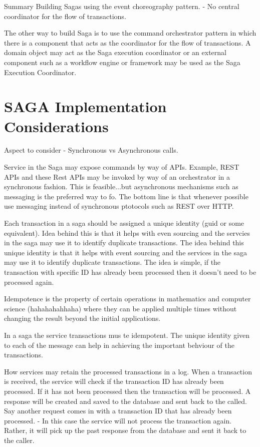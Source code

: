 \documentclass[a4paper, 11pt]{book}
\begin{document}
    Summary
    Building Sagas using the event choreography pattern.
    - No central coordinator for the flow of transactions.

    The other way to build Saga is to use the command orchestrator pattern in which there is a component that acts as the coordinator for the flow of transactions.
    A domain object may act as the Saga execution coordinator or an external component such as a workflow engine or framework may be used as the Saga Execution Coordinator.


    \section{SAGA Implementation Considerations}
    Aspect to consider - Synchronous vs Asynchronous calls.

    Service in the Saga may expose commands by way of APIs. Example, REST APIs and these Rest APIs may be invoked by way of an orchestrator in a synchronous fashion.
    This is feasible...but asynchronous mechanisms such as messaging is the preferred way to fo.
    The bottom line is that whenever possible use messaging instead of synchronous ptotocols such as REST over HTTP.

    Each transaction in a saga should be assigned a unique identity (guid or some equivalent). Idea behind this is that it helps with even sourcing and the servcies in the saga may use it to identify duplicate transactions.
    The idea behind this unique identity is that it helps with event sourcing and the services in the saga may use it to identify duplicate transactions.
    The idea is simple, if the transaction with specific ID has already been processed then it doesn't need to be processed again.

    Idempotence is the property of certain operations in mathematics and computer science (hahahahahhaha) where they can be applied multiple times without changing the result beyond the initial applications.

    In a saga the service transactions mus te idempotent. The unique identity given to each of the message can help in achieving the important behviour of the transactions.

    How services may retain the processed transactions in a log.
    When a transaction is received, the service will check if the transaction ID has already been processed.
    If it has not been processed then the transaction will be processed.
    A response will be created and saved to the database and sent back to the called.
    Say another request comes in with a transaction ID that has already been processed.
    - In this case the service will not process the transaction again.
    Rather, it will pick up the past response from the database and sent it back to the caller.
\end{document}
